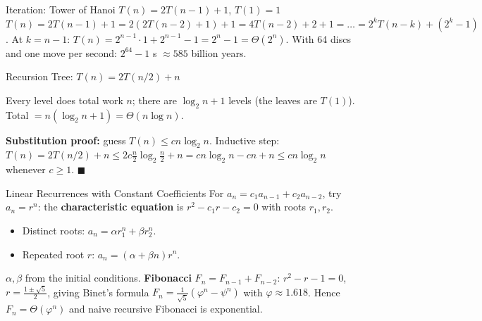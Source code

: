 \documentclass[11pt,a4paper]{article}
\begin{document}
\begin{worked}{Iteration: Tower of Hanoi $T(n) = 2T(n-1) + 1$, $T(1) = 1$}
$T(n) = 2T(n-1) + 1 = 2(2T(n-2) + 1) + 1 = 4T(n-2) + 2 + 1 = \dots = 2^{k}T(n-k) + (2^k - 1)$. At $k = n - 1$: $T(n) = 2^{n-1}\cdot 1 + 2^{n-1} - 1 = 2^n - 1 = \Theta(2^n)$. With 64 discs and one move per second: $2^{64} - 1$ s $\approx 585$ billion years.
\end{worked}

\begin{worked}{Recursion Tree: $T(n) = 2T(n/2) + n$}
\begin{center}
\end{center}
Every level does total work $n$; there are $\log_2 n + 1$ levels (the leaves are $T(1)$). Total $= n(\log_2 n + 1) = \Theta(n\log n)$.

\textbf{Substitution proof:} guess $T(n) \le cn\log_2 n$. Inductive step: $T(n) = 2T(n/2) + n \le 2c\frac n2\log_2\frac n2 + n = cn\log_2 n - cn + n \le cn \log_2 n$ whenever $c \ge 1$. $\blacksquare$
\end{worked}

\begin{formulabox}{Linear Recurrences with Constant Coefficients}
For $a_n = c_1 a_{n-1} + c_2 a_{n-2}$, try $a_n = r^n$: the \textbf{characteristic equation} is $r^2 - c_1 r - c_2 = 0$ with roots $r_1, r_2$.
\begin{itemize}
    \item Distinct roots: $a_n = \alpha r_1^n + \beta r_2^n$.
    \item Repeated root $r$: $a_n = (\alpha + \beta n) r^n$.
\end{itemize}
$\alpha, \beta$ from the initial conditions. \textbf{Fibonacci} $F_n = F_{n-1} + F_{n-2}$: $r^2 - r - 1 = 0$, $r = \frac{1 \pm \sqrt5}{2}$, giving Binet's formula $F_n = \frac{1}{\sqrt5}\left(\varphi^n - \psi^n\right)$ with $\varphi \approx 1.618$. Hence $F_n = \Theta(\varphi^n)$ and naive recursive Fibonacci is exponential.
\end{formulabox}
\end{document}
